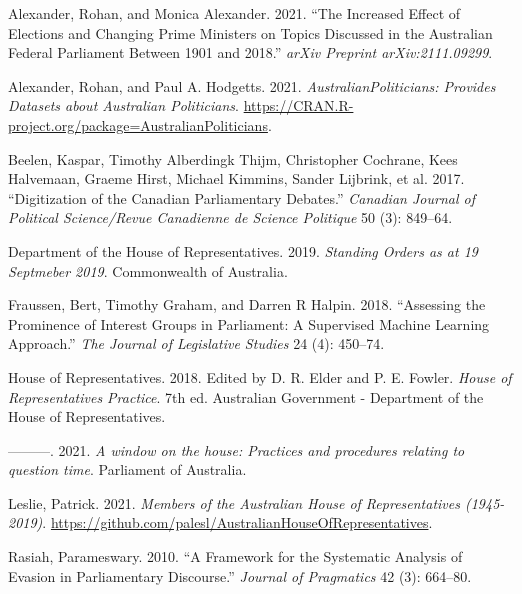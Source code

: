 \documentclass[
  letterpaper,
  DIV=11,
  numbers=noendperiod]{scrartcl}
\newlength{\cslhangindent}
\newlength{\cslentryspacingunit} %
\newenvironment{CSLReferences}[2] %
 {%
  \setlength{\parindent}{0pt}
  \ifodd #1
  \let\oldpar\par
  \def\par{\hangindent=\cslhangindent\oldpar}
  \fi
  \setlength{\parskip}{#2\cslentryspacingunit}
 }%
 {}
\begin{document}
\hypertarget{refs}{}
\begin{CSLReferences}{1}{0}
\leavevmode{}%
Alexander, Rohan, and Monica Alexander. 2021. {``The Increased Effect of
Elections and Changing Prime Ministers on Topics Discussed in the
Australian Federal Parliament Between 1901 and 2018.''} \emph{arXiv
Preprint arXiv:2111.09299}.

\leavevmode{}%
Alexander, Rohan, and Paul A. Hodgetts. 2021.
\emph{AustralianPoliticians: Provides Datasets about Australian
Politicians}.
\url{https://CRAN.R-project.org/package=AustralianPoliticians}.

\leavevmode{}%
Beelen, Kaspar, Timothy Alberdingk Thijm, Christopher Cochrane, Kees
Halvemaan, Graeme Hirst, Michael Kimmins, Sander Lijbrink, et al. 2017.
{``Digitization of the Canadian Parliamentary Debates.''} \emph{Canadian
Journal of Political Science/Revue Canadienne de Science Politique} 50
(3): 849--64.

\leavevmode{}%
Department of the House of Representatives. 2019. \emph{Standing Orders
as at 19 Septmeber 2019}. Commonwealth of Australia.

\leavevmode{}%
Fraussen, Bert, Timothy Graham, and Darren R Halpin. 2018. {``Assessing
the Prominence of Interest Groups in Parliament: A Supervised Machine
Learning Approach.''} \emph{The Journal of Legislative Studies} 24 (4):
450--74.

\leavevmode{}%
House of Representatives. 2018. Edited by D. R. Elder and P. E. Fowler.
\emph{{House of Representatives Practice}}. 7th ed. {Australian
Government - Department of the House of Representatives}.

\leavevmode{}%
---------. 2021. \emph{{A window on the house: Practices and procedures
relating to question time}}. {Parliament of Australia}.

\leavevmode{}%
Leslie, Patrick. 2021. \emph{Members of the Australian House of
Representatives (1945-2019)}.
\url{https://github.com/palesl/AustralianHouseOfRepresentatives}.

\leavevmode{}%
Rasiah, Parameswary. 2010. {``A Framework for the Systematic Analysis of
Evasion in Parliamentary Discourse.''} \emph{Journal of Pragmatics} 42
(3): 664--80.


\end{CSLReferences}
\end{document}
